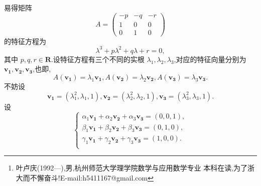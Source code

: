 \documentclass[a4paper]{article}
\begin{document}
\title{\huge{}} \author{\small{叶卢
    庆\footnote{叶卢庆(1992---),男,杭州师范大学理学院数学与应用数学专业
      本科在读,为了浙大而不懈奋斗!E-mail:h5411167@gmail.com}}\\{\small{杭州师范大学理学院,浙
      江~杭州~310036}}}
\maketitle
易得矩阵
$$
A=\begin{pmatrix}
  -p&-q&-r\\
1&0&0\\
0&1&0
\end{pmatrix}
$$
的特征方程为
$$
\lambda^3+p\lambda^2+q\lambda+r=0,
$$
其中 $p,q,r\in \mathbf{R}$.设特征方程有三个不同的实根
$\lambda_1,\lambda_2,\lambda_3$,对应的特征向量分别为
$\mathbf{v_1,v_2,v_3}$,也即,
$$
A(\mathbf{v_1})=\lambda_1\mathbf{v_1},A(\mathbf{v_2})=\lambda_2\mathbf{v_2},A(\mathbf{v_3})=\lambda_3\mathbf{v_3}.
$$
不妨设
$$
\mathbf{v_1}=(\lambda_1^2,\lambda_1,1),\mathbf{v_2}=(\lambda_2^2,\lambda_2,1),\mathbf{v_3}=(\lambda_3^2,\lambda_3,1).
$$
设
$$
\begin{cases}
  \alpha_1\mathbf{v_1}+\alpha_2\mathbf{v_2}+\alpha_3\mathbf{v_3}=(0,0,1),\\
  \beta_1\mathbf{v_1}+\beta_2\mathbf{v_2}+\beta_3\mathbf{v_3}=(0,1,0),\\
  \gamma_1\mathbf{v_1}+\gamma_2\mathbf{v_2}+\gamma_3\mathbf{v_3}=(1,0,0).\\
\end{cases}
$$
\end{document}
